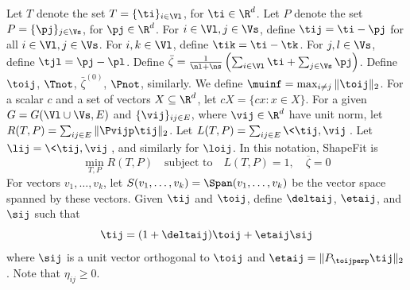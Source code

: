 Let $T$ denote the set $T = \{ \ti\}_{i \in \Vl }$, for $\ti \in \R^{d}$.  Let $P$ denote the set $P = \{\pj\}_{j \in \Vs}$, for $\pj \in \R^{d}$.  For $i \in \Vl, j \in \Vs$, define $\tij = \ti - \pj$
for all $i \in \Vl, j \in \Vs$.  For $i,k \in \Vl$, define $\tik = \ti - \tk$.  For $j,l \in \Vs$, define $\tjl = \pj - \pl$. 
Define $\bar{\zeta} = \frac{1}{\nl+\ns} \left( \sum_{i \in \Vl} \ti + \sum_{j \in \Vs} \pj  \right)$.  Define $\toij$, $\Tnot$, $\bar{\zeta}^{(0)}$, $\Pnot$, similarly. We define $\muinf = \max_{i\neq j} \|\toij\|_2$.  For a scalar $c$ and a set of vectors $X \subseteq \R^{d}$, let $c X = \{c x : x \in X\}$. 
 For a given $G=G(\Vl \cup \Vs,E)$ and $\{\vij\}_{ij \in E}$, where $\vij \in \R^{d}$ have unit norm, 
 let $R(T, P) = \sum_{ij \in E} \| \Pvijp \tij \|_2$.   Let $L(T,P) = \sum_{ij \in E} \< \tij, \vij \>$.  Let $\lij = \< \tij, \vij \>$, and similarly for $\loij$.  In this notation, ShapeFit is
\[
\min_{T,P} R(T,P) \quad \text{subject to} \quad  L(T,P) = 1, \quad \overline{\zeta}  = 0
\]
For vectors $v_1, \ldots, v_k$, let $S(v_1, \ldots, v_k) = \Span(v_1, \ldots, v_k)$ be the vector space spanned by these vectors.  
Given $\tij$ and $\toij$, define $\deltaij$, $\etaij$, and $\sij$ such that 
\[
\tij = (1 + \deltaij) \toij + \etaij \sij
\]
where $\sij$ is a unit vector orthogonal to $\toij$ and $\etaij = \| P_{\toijperp} \tij \|_2$.
Note that $\eta_{ij} \ge 0$. 


